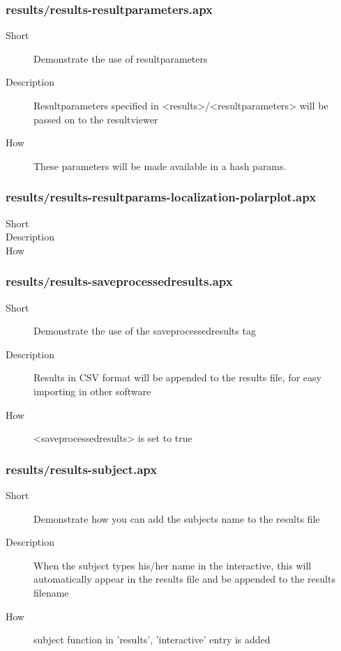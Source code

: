 \subsubsection{results/results-resultparameters.apx}
\begin{description}
\item[Short] 
 Demonstrate the use of resultparameters
\item[Description] 
 Resultparameters specified in \textless{}results\textgreater{}/\textless{}resultparameters\textgreater{} will be passed on to the resultviewer
\item[How] 
 These parameters will be made available in a hash params. 
\end{description}

\subsubsection{results/results-resultparams-localization-polarplot.apx}
\begin{description}
\item[Short] 

\item[Description] 

\item[How] 

\end{description}

\subsubsection{results/results-saveprocessedresults.apx}
\begin{description}
\item[Short] 
 Demonstrate the use of the saveprocessedresults tag
\item[Description] 
 Results in CSV format will be appended to the results file, for easy importing in other software
\item[How] 
 \textless{}saveprocessedresults\textgreater{} is set to true
\end{description}

\subsubsection{results/results-subject.apx}
\begin{description}
\item[Short] 
 Demonstrate how you can add the subjects name to the results file
\item[Description] 
 When the subject types his/her name in the interactive, this will automatically appear in the results file and be appended to the results filename
\item[How] 
 subject function in 'results', 'interactive' entry is added
\end{description}

